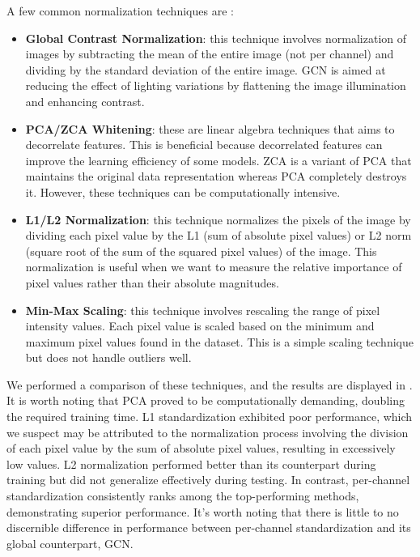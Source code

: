 A few common normalization techniques are :

\begin{itemize}
    \item \textbf{Global Contrast Normalization}: this technique involves normalization of images by subtracting the mean of the entire image (not per channel) and dividing by the standard deviation of the entire image. GCN is aimed at reducing the effect of lighting variations by flattening the image illumination and enhancing contrast.
    \item \textbf{PCA/ZCA Whitening}: these are linear algebra techniques that aims to decorrelate features. This is beneficial because decorrelated features can improve the learning efficiency of some models. ZCA is a variant of PCA that maintains the original data representation whereas PCA completely destroys it. However, these techniques can be computationally intensive.
    \item \textbf{L1/L2 Normalization}: this technique normalizes the pixels of the image by dividing each pixel value by the L1 (sum of absolute pixel values) or L2 norm (square root of the sum of the squared pixel values) of the image. This normalization is useful when we want to measure the relative importance of pixel values rather than their absolute magnitudes.
    \item \textbf{Min-Max Scaling}: this technique involves rescaling the range of pixel intensity values. Each pixel value is scaled based on the minimum and maximum pixel values found in the dataset. This is a simple scaling technique but does not handle outliers well.
\end{itemize}

We performed a comparison of these techniques, and the results are displayed in . It is worth noting that PCA proved to be computationally demanding, doubling the required training time. L1 standardization exhibited poor performance, which we suspect may be attributed to the normalization process involving the division of each pixel value by the sum of absolute pixel values, resulting in excessively low values. L2 normalization performed better than its counterpart during training but did not generalize effectively during testing. In contrast, per-channel standardization consistently ranks among the top-performing methods, demonstrating superior performance. It's worth noting that there is little to no discernible difference in performance between per-channel standardization and its global counterpart, GCN.

